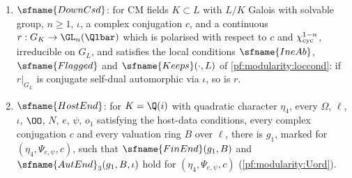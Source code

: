 \begin{definition}\label{pf:modularity:downdef}
\begin{enumerate}[label=(\alph*)]
\item $\sfname{DownCsd}$: for CM fields $K\subset L$ with $L/K$ Galois with solvable group, $n\ge1$, $\iota$, a complex
conjugation $c$, and a continuous $r:G_K\to\GL_n(\Qlbar)$ which is polarised with respect to $c$ and
$\chi_{\mathrm{cyc}}^{1-n}$, irreducible on $G_L$, and satisfies the local conditions $\sfname{IneAb}$, $\sfname{Flagged}$
and $\sfname{Keeps}(\cdot,L)$ of \cref{pf:modularity:loccond}: if $r|_{G_L}$ is conjugate self-dual automorphic via $\iota$, so is
$r$.
\item $\sfname{HostEnd}$: for $K=\Q(i)$ with quadratic character $\eta_4$, every $\Omega$, $\ell$, $\iota$, $\OO$, $N$,
$e$, $\psi$, $o_1$ satisfying the host-data conditions, every complex conjugation $c$ and every valuation ring $B$ over
$\ell$, there is $g_1$, marked for $(\eta_4,\Psi_{e,\psi},c)$, such that $\sfname{FinEnd}(g_1,B)$ and
$\sfname{AutEnd}_3(g_1,B,\iota)$ hold for $(\eta_4,\Psi_{e,\psi},c)$ (\cref{pf:modularity:Uord}).
\end{enumerate}
\end{definition}

